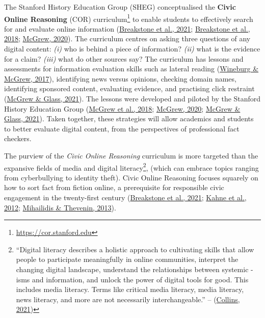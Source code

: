 \documentclass[a4paper, nobind]{templates/ociamthesis}
\begin{document}
The Stanford History Education Group (SHEG) conceptualised the \textbf{Civic
Online Reasoning} (COR) curriculum\footnote{\url{https://cor.stanford.edu}} to enable students to
effectively search for and evaluate online information
(\protect\hyperlink{ref-breakstone2021students}{Breakstone et al., 2021}; \protect\hyperlink{ref-breakstone2018we}{Breakstone et al., 2018}; \protect\hyperlink{ref-mcgrew2020learning}{McGrew, 2020}). The
curriculum centres on asking three questions of any digital content:
\emph{(i)} who is behind a piece of information? \emph{(ii)} what is the evidence
for a claim? \emph{(iii)} what do other sources say? The curriculum has
lessons and assessments for information evaluation skills such as
lateral reading (\protect\hyperlink{ref-wineburg2017lateral}{Wineburg \& McGrew, 2017}), identifying news versus
opinions, checking domain names, identifying sponsored content,
evaluating evidence, and practising click restraint (\protect\hyperlink{ref-mcgrew2021click}{McGrew \& Glass, 2021}).
The lessons were developed and piloted by the Stanford History Education
Group (\protect\hyperlink{ref-mcgrew2018can}{McGrew et al., 2018}; \protect\hyperlink{ref-mcgrew2020learning}{McGrew, 2020}; \protect\hyperlink{ref-mcgrew2021click}{McGrew \& Glass, 2021}). Taken
together, these strategies will allow academics and students to better
evaluate digital content, from the perspectives of professional fact
checkers.

The purview of the \emph{Civic Online Reasoning} curriculum is more targeted
than the expansive fields of media and digital literacy\footnote{``Digital literacy describes a holistic approach to cultivating
  skills that allow people to participate meaningfully in online
  communities, interpret the changing digital landscape, understand
  the relationships between systemic -isms and information, and unlock
  the power of digital tools for good. This includes media literacy.
  Terms like critical media literacy, media literacy, news literacy,
  and more are not necessarily interchangeable.'' --
  (\protect\hyperlink{ref-collins2021reimagining}{Collins, 2021})}, (which can
embrace topics ranging from cyberbullying to identity theft). Civic
Online Reasoning focuses squarely on how to sort fact from fiction
online, a prerequisite for responsible civic engagement in the
twenty-first century
(\protect\hyperlink{ref-breakstone2021students}{Breakstone et al., 2021}; \protect\hyperlink{ref-kahne2012digital}{Kahne et al., 2012}; \protect\hyperlink{ref-mihailidis2013media}{Mihailidis \& Thevenin, 2013}).
\end{document}
